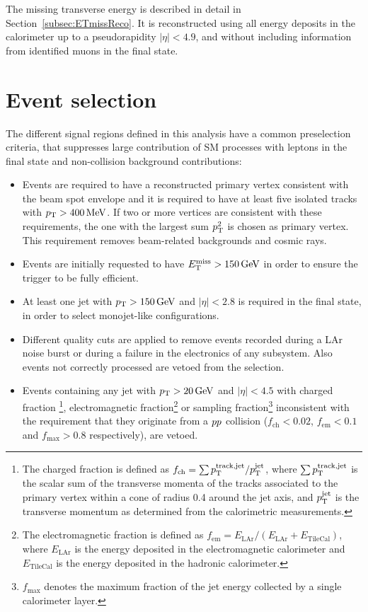 The missing transverse energy is described in detail in Section~\ref{subsec:ETmissReco}.
It is reconstructed using all energy deposits in the calorimeter up to a pseudorapidity $|\eta|<4.9$, and without including information from identified muons in the final state.


\section{Event selection}
    \label{sec:EventSelection}

The different signal regions defined in this analysis have a common preselection criteria, that suppresses large contribution of SM processes with leptons in the final state and non-collision background contributions:

\begin{itemize}
\item Events are required to have a reconstructed primary vertex consistent with the beam spot envelope and it is required to have at least five isolated tracks with $\pt>\unit[400]{MeV}$.
If two or more vertices are consistent with these requirements, the one with the largest sum $p_{\mathrm{T}}^2$ is chosen as primary vertex.
This requirement removes beam-related backgrounds and cosmic rays.

\item Events are initially requested to have $\met>\unit[150]{GeV}$ in order to ensure the trigger to be fully efficient.

\item At least one jet with $\pt>\unit[150]{GeV}$ and $|\eta|<2.8$ is required in the final state, in order to select monojet-like configurations.

\item Different quality cuts are applied to remove events recorded during a LAr noise burst or during a failure in the electronics of any subsystem.
Also events not correctly processed are vetoed from the selection.

\item Events containing any jet with $\pt>\unit[20]{GeV}$ and $|\eta|<4.5$ with charged fraction \footnote{The charged fraction is defined as $f_{\text{ch}} = \sum{\ensuremath{p_{\mathrm{T}}}^{\text{track,jet}}/\ensuremath{p_{\mathrm{T}}}^{\text{jet}}}$, where $\sum{\ensuremath{p_{\mathrm{T}}}^{\text{track,jet}}}$ is the scalar sum of the transverse momenta of the tracks associated to the primary vertex within a cone of radius 0.4 around the jet axis, and $p_{\mathrm{T}}^{\text{jet}}$ is the transverse momentum as determined from the calorimetric measurements.}, 
electromagnetic fraction\footnote{The electromagnetic fraction is defined as $f_{\text{em}} = E_{\text{LAr}}/(E_{\text{LAr}} + E_{\text{TileCal}})$, where $E_{\text{LAr}}$ is the energy deposited in the electromagnetic calorimeter and $E_{\text{TileCal}}$ is the energy deposited in the hadronic calorimeter.} 
or sampling fraction\footnote{$f_{\text{max}}$ denotes the maximum fraction of the jet energy collected by a single calorimeter layer.} inconsistent with the requirement that they originate from a $pp$ collision ($f_{\text{ch}}<0.02$, $f_{\text{em}}<0.1$ and $f_{\text{max}}>0.8$ respectively), are vetoed.


\end{itemize}
